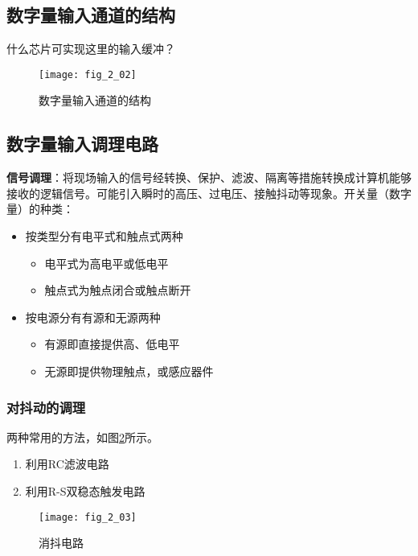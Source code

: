 \subsection{数字量输入通道的结构}



什么芯片可实现这里的输入缓冲？
\begin{figure}[h]
  \centering
  \texttt{[image: fig\_2\_02]}\\
  \caption{数字量输入通道的结构}\label{fig_2_02}
\end{figure}


\subsection{数字量输入调理电路}
\textbf{信号调理}：将现场输入的信号经转换、保护、滤波、隔离等措施转换成计算机能够接收的逻辑信号。可能引入瞬时的高压、过电压、接触抖动等现象。开关量（数字量）的种类：
\begin{itemize}
  \item 按类型分有电平式和触点式两种
  \begin{itemize}
    \item 电平式为高电平或低电平
    \item 触点式为触点闭合或触点断开
  \end{itemize}
  \item 按电源分有有源和无源两种
  \begin{itemize}
    \item 有源即直接提供高、低电平

    \item 无源即提供物理触点，或感应器件

  \end{itemize}

\end{itemize}


\subsubsection{对抖动的调理}

两种常用的方法，如图\ref{fig_2_03}所示。
\begin{enumerate}
  \item 利用RC滤波电路
  \item 利用R-S双稳态触发电路
\end{enumerate}



\begin{figure}[h]
  \centering
  \texttt{[image: fig\_2\_03]}\\
  \caption{消抖电路}\label{fig_2_03}
\end{figure}

